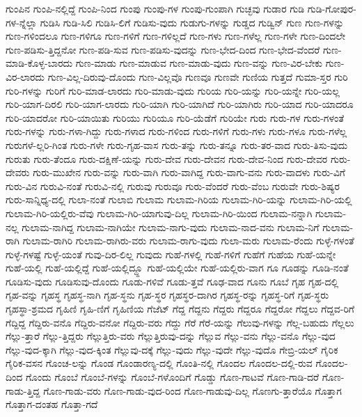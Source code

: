 {ಗುಂಪಿನ
ಗುಂಪಿ-ನಲ್ಲಿದ್ದೆ
ಗುಂಪಿ-ನಿಂದ
ಗುಂಪು
ಗುಂಪು-ಗಳ
ಗುಂಪು-ಗುಂಪಾಗಿ
ಗುಚ್ಛವು
ಗುಡಾರ
ಗುಡಿ
ಗುಡಿ-ಗೋಪುರ-ಗಳ-ನ್ನೆಲ್ಲಾ
ಗುಡಿಸಿ
ಗುಡಿ-ಸಿಲಿ
ಗುಡಿಸಿ-ಲಿಗೆ
ಗುಡಿಸು-ವುದು
ಗುಡುಗು-ಗಳನ್ನು
ಗುಡ್ಡದ
ಗುಡ್ವಿನ್
ಗುಣ
ಗುಣ-ಗಳನ್ನು
ಗುಣ-ಗಳಿಂದಲೂ
ಗುಣ-ಗಳಿಗೂ
ಗುಣ-ಗಳಿಗೆ
ಗುಣ-ಗಳಿಲ್ಲದೆ
ಗುಣ-ಗಳು
ಗುಣ-ಗಳೆಲ್ಲ
ಗುಣ-ಗಳೇ
ಗುಣ-ದಿಂದಲೇ
ಗುಣ-ಪಡಿಸು-ತ್ತಿದ್ದನೋ
ಗುಣ-ಪಡಿ-ಸುವ
ಗುಣ-ಪಡಿಸು-ವುದನ್ನು
ಗುಣ-ಭೇದ-ದಿಂದ
ಗುಣ-ಭೇದ-ವೆಂದರೆ
ಗುಣ-ಮಾಡಿ-ಕೊಳ್ಳ-ಬಾರದು
ಗುಣ-ಮಾಡು
ಗುಣ-ಮಾಡುವ
ಗುಣ-ಮಾಡು-ವುದು
ಗುಣ-ವನ್ನು
ಗುಣ-ವಿರ-ಬೇಕು
ಗುಣ-ವಿರ-ಲಾರದು
ಗುಣ-ವಿಲ್ಲ-ದಿರುವು-ದೊಂದು
ಗುಣ-ವಿಲ್ಲವೊ
ಗುಣವೂ
ಗುಣವೇ
ಗುಣಿಯ
ಗುತ್ತದೆ
ಗುಮಾ-ಸ್ತರ
ಗುರಿ
ಗುರಿ-ಗಳನ್ನು
ಗುರಿಗೆ
ಗುರಿ-ಮಾಡ-ಲಾರದು
ಗುರಿ-ಮಾಡು-ವುದು
ಗುರಿಯ
ಗುರಿ-ಯನ್ನು
ಗುರಿ-ಯನ್ನೇ
ಗುರಿ-ಯಲ್ಲ
ಗುರಿ-ಯಾಗ-ದಿರಲಿ
ಗುರಿ-ಯಾಗ-ಲಾರದು
ಗುರಿ-ಯಾಗಿ
ಗುರಿ-ಯಾಗಿದೆ
ಗುರಿ-ಯಾಗಿರು
ಗುರಿ-ಯಾದ
ಗುರಿ-ಯಾದರೂ
ಗುರಿ-ಯಾದರೋ
ಗುರಿ-ಯಾಯಿತು
ಗುರಿಯು
ಗುರಿಯೂ
ಗುರಿ-ಯೆಡೆಗೆ
ಗುರಿಯೇ
ಗುರು
ಗುರು-ಗಳ
ಗುರು-ಗಳಂತೆ
ಗುರು-ಗಳನ್ನು
ಗುರು-ಗಳಾ-ಗಿದ್ದು
ಗುರು-ಗಳಾದ
ಗುರು-ಗಳಿಂದ
ಗುರು-ಗಳಿಗೆ
ಗುರು-ಗಳು
ಗುರು-ಗಳೂ
ಗುರು-ಗಳೆಲ್ಲ
ಗುರುಗಳೆ-ಲ್ಲರಿ-ಗಿಂತ
ಗುರು-ಗಳೇ
ಗುರು-ಗೃಹ-ವಾಸ
ಗುರು-ತನ್ನು
ಗುರು-ತನ್ನೂ
ಗುರು-ತರ-ವಾದ
ಗುರು-ತಿಸು-ವುದು
ಗುರುತು
ಗುರು-ತೆಂದೂ
ಗುರು-ದಕ್ಷಿಣೆ-ಯನ್ನು
ಗುರು-ದೇವ
ಗುರು-ದೇವನ
ಗುರು-ದೇವ-ನಿಂದ
ಗುರು-ದೇವರ
ಗುರು-ದೇವರು
ಗುರು-ಮುಖೇನ
ಗುರು-ವನ್ನು
ಗುರು-ವಾಗಿ
ಗುರು-ವಾಗಿದ್ದ
ಗುರು-ವಾಗು-ವನು
ಗುರು-ವಾದಳು
ಗುರು-ವಿಗೆ
ಗುರು-ವಿನ
ಗುರುವಿ-ನಂತೆ
ಗುರುವಿ-ನಲ್ಲಿ
ಗುರುವು
ಗುರುವೂ
ಗುರು-ವೆಂದರೆ
ಗುರು-ವೆಂಬ
ಗುರುವೇ
ಗುರು-ಶಿಷ್ಯರ
ಗುರು-ಸಾನ್ನಿಧ್ಯ-ದಲ್ಲಿ
ಗುಲಾ-ನಂತೆ
ಗುಲಾಬಿ
ಗುಲಾಮ
ಗುಲಾಮ-ಗಿರಿಯ
ಗುಲಾಮ-ಗಿರಿ-ಯನ್ನು
ಗುಲಾಮ-ಗಿರಿ-ಯಲ್ಲಿ
ಗುಲಾಮ-ಗಿರಿ-ಯಲ್ಲಿರು-ವೆವು
ಗುಲಾಮ-ಗಿರಿ-ಯಾಗುವು-ದಿಲ್ಲ
ಗುಲಾಮ-ಗಿರಿ-ಯಿಂದ
ಗುಲಾಮ-ನನ್ನಾಗಿ
ಗುಲಾಮ-ನಲ್ಲ
ಗುಲಾಮ-ನಾಗಿದ್ದ
ಗುಲಾಮ-ನಾಗಿಯೇ
ಗುಲಾಮ-ನಾಗು-ವುದು
ಗುಲಾಮ-ನಾದ-ವನು
ಗುಲಾಮ-ನಿಗೆ
ಗುಲಾಮ-ರಾಗಿ
ಗುಲಾಮ-ರಾಗಿರಿ
ಗುಲಾಮ-ರಾಗಿರು-ವರು
ಗುಲಾಮ-ರಾಗು-ವುದು
ಗುಲಾ-ಮರು
ಗುಲಾಮ-ರೆಂದು
ಗುಳ್ಳೆ-ಗಳಂತೆ
ಗುಳ್ಳೆ-ಗಳಷ್ಟೆ
ಗುಳ್ಳೆ-ಯಂತೆ
ಗುವು-ದಿರ-ಲಿಲ್ಲ
ಗುವುದು
ಗುಹೆ-ಗಳಲ್ಲಿ
ಗುಹೆ-ಗಳಿಗೆ
ಗುಹೆಗೆ
ಗುಹೆಯ
ಗುಹೆ-ಯನ್ನೇ
ಗುಹೆ-ಯಲ್ಲಿ
ಗುಹೆ-ಯಲ್ಲಿದ್ದೆ
ಗುಹೆ-ಯಲ್ಲಿದ್ದ್ದೂ
ಗುಹೆ-ಯಲ್ಲಿಯೇ
ಗುಹೆ-ಯಲ್ಲಿರು-ವಾಗ
ಗೂ
ಗೂಡನ್ನು
ಗೂಡಿ-ನಂತೆ
ಗೂಡಿಸು-ವುದು
ಗೂಡಿಸುವು-ದೊಂದು
ಗೂಡು-ಗಳಿವೆ
ಗೂಡು-ತ್ತವೆ
ಗೂಢ-ವಾದ
ಗೂನು
ಗೂಬೆ
ಗೃಹ
ಗೃಹ-ದಲ್ಲಿ
ಗೃಹ-ವನ್ನು
ಗೃಹಸ್ಥ
ಗೃಹಸ್ಥ-ನಾಗಿ
ಗೃಹ-ಸ್ಥನು
ಗೃಹ-ಸ್ಥರ
ಗೃಹಸ್ಥರ-ದಾಗಿರ
ಗೃಹಸ್ಥ-ರನ್ನು
ಗೃಹಸ್ಥ-ರಿಗೆ
ಗೃಹ-ಸ್ಥರು
ಗೃಹಸ್ಥಾ-ಶ್ರಮದ
ಗೃಹಿಣಿ
ಗೃಹಿ-ಣಿಗೆ
ಗೃಹಿಣಿಯ
ಗೆಜೆಟ್
ಗೆದ್ದ
ಗೆದ್ದನು
ಗೆದ್ದರು
ಗೆದ್ದರೂ
ಗೆದ್ದರೋ
ಗೆದ್ದಲು
ಗೆದ್ದವ-ರಿಗೆ
ಗೆದ್ದಿದ್ದ
ಗೆದ್ದಿರು-ವನೊ
ಗೆದ್ದಿರು-ವನೋ
ಗೆದ್ದಿರು-ವರು
ಗೆದ್ದು
ಗೆರೆ
ಗೆರೆ-ಯನ್ನು
ಗೆಲುವು-ಗಳನ್ನು
ಗೆಲ್ಲ-ಬಹುದು
ಗೆಲ್ಲಲು
ಗೆಲ್ಲು-ತ್ತಾರೆ
ಗೆಲ್ಲು-ತ್ತಿದ್ದರು
ಗೆಲ್ಲುತ್ತಿರು-ವರು
ಗೆಲ್ಲುತ್ತಿರುವು-ದನ್ನು
ಗೆಲ್ಲುವ
ಗೆಲ್ಲು-ವನು
ಗೆಲ್ಲು-ವನೊ
ಗೆಲ್ಲು-ವುದ
ಗೆಲ್ಲು-ವುದ-ಕ್ಕಾಗಿ
ಗೆಲ್ಲು-ವುದ-ಕ್ಕಿಂತ
ಗೆಲ್ಲುವು-ದಕ್ಕೆ
ಗೆಲ್ಲು-ವುದು
ಗೆಲ್ಲು-ವುದೇ
ಗೆಲ್ಲು-ವುದೊ
ಗೇಬ್ರಿ-ಯಲ್
ಗೈರಿಕ
ಗೈರಿಕ-ವಸನ
ಗೊಂಚ-ಲನ್ನು
ಗೊಂಡ
ಗೊಂಡಾರಣ್ಯ-ದಲ್ಲಿ
ಗೊಂತಿ-ನಲ್ಲಿ
ಗೊಂದಲ
ಗೊಂದಲ-ದಲ್ಲಿ-ರುವ
ಗೊಂದಲ-ದಿಂದ
ಗೊಂದು
ಗೊಂಬೆ
ಗೊಂಬೆ-ಗಳನ್ನು
ಗೊಂಬೆ-ಗಳೊಂದಿಗೆ
ಗೊಡ್ಡು
ಗೊಣ-ಗಾಟವೆ
ಗೊಣ-ಗಾಡಿ-ದರೆ
ಗೊಣ-ಗಾಡು-ತ್ತಿದ್ದ
ಗೊಣ-ಗಾಡು-ವರು
ಗೊಣ-ಗಾಡು-ವುದ-ರಿಂದ
ಗೊಣ-ಗಾಡುವು-ದಿಲ್ಲ
ಗೊಣಗು-ತ್ತಾರೆಯೊ
ಗೊತ್ತಾಗ
ಗೊತ್ತಾಗ-ದಂತಹ
ಗೊತ್ತಾ-ಗದೆ
}
